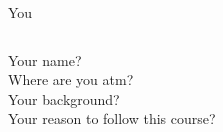 \begin{frame}{You}
	\begin{columns}
		Your name?\\
		Where are you atm? \\
		Your background?\\
		Your reason to follow this course?
	\end{columns}
\end{frame}

